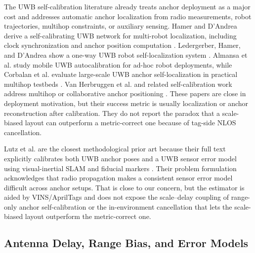 \documentclass[11pt,a4paper]{article}
\begin{document}
The UWB self-calibration literature already treats anchor deployment as a major cost and addresses automatic anchor localization from radio measurements, robot trajectories, multihop constraints, or auxiliary sensing. Hamer and D'Andrea derive a self-calibrating UWB network for multi-robot localization, including clock synchronization and anchor position computation \citep{hamer_2018_self_calibrating_ultra_wideband_network}. Ledergerber, Hamer, and D'Andrea show a one-way UWB robot self-localization system \citep{ledergerber_2015_robot_self_localization_one_way_uwb}. Almansa et al. study mobile UWB autocalibration for ad-hoc robot deployments, while Corbalan et al. evaluate large-scale UWB anchor self-localization in practical multihop testbeds \citep{almansa_2020_autocalibration_mobile_uwb_localization,corbalan_2023_self_localization_uwb_anchors}. Van Herbruggen et al. and related self-calibration work address multihop or collaborative anchor positioning \citep{herbruggen_2023_multihop_self_calibration_algori,ridolfi_2021_self_calibration_and_collaborati,shi_2019_anchor_self_localization_algorit}. These papers are close in deployment motivation, but their success metric is usually localization or anchor reconstruction after calibration. They do not report the paradox that a scale-biased layout can outperform a metric-correct one because of tag-side NLOS cancellation.

Lutz et al. are the closest methodological prior art because their full text explicitly calibrates both UWB anchor poses and a UWB sensor error model using visual-inertial SLAM and fiducial markers \citep{lutz_2019_visual_inertial_slam_uwb_error_model}. Their problem formulation acknowledges that radio propagation makes a consistent sensor error model difficult across anchor setups. That is close to our concern, but the estimator is aided by VINS/AprilTags and does not expose the scale--delay coupling of range-only anchor self-calibration or the in-environment cancellation that lets the scale-biased layout outperform the metric-correct one.

\subsection{Antenna Delay, Range Bias, and Error Models}
\end{document}
